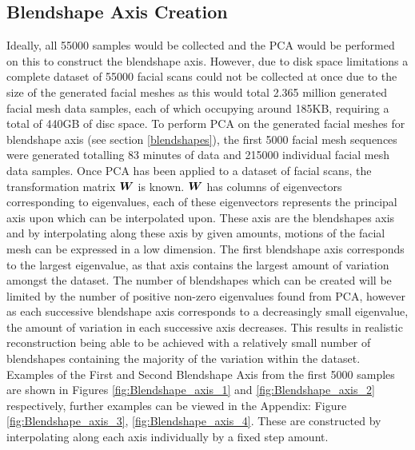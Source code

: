 \subsection{Blendshape Axis Creation}
Ideally, all 55000 samples would be collected and the PCA would be performed on this to construct the blendshape axis.
However, due to disk space limitations a complete dataset of 55000 facial scans could not be collected at once due to the size of the generated facial meshes as this would total 2.365 million generated facial mesh data samples, each of which occupying around 185KB, requiring a total of 440GB of disc space.
To perform PCA on the generated facial meshes for blendshape axis (see section \ref{blendshapes}), the first 5000 facial mesh sequences were generated totalling 83 minutes of data and 215000 individual facial mesh data samples. 
Once PCA has been applied to a dataset of facial scans, the transformation matrix ${\boldsymbol{{W}}}$ is known.
${\boldsymbol{{W}}}$ has columns of eigenvectors corresponding to eigenvalues, each of these eigenvectors represents the principal axis upon which can be interpolated upon.
These axis are the blendshapes axis and by interpolating along these axis by given amounts, motions of the facial mesh can be expressed in a low dimension.
The first blendshape axis corresponds to the largest eigenvalue, as that axis contains the largest amount of variation amongst the dataset.
The number of blendshapes which can be created will be limited by the number of positive non-zero eigenvalues found from PCA, however as each successive blendshape axis corresponds to a decreasingly small eigenvalue, the amount of variation in each successive axis decreases. 
This results in realistic reconstruction being able to be achieved with a relatively small number of blendshapes containing the majority of the variation within the dataset.
Examples of the First and Second Blendshape Axis from the first 5000 samples are shown in Figures \ref{fig:Blendshape_axis_1} and \ref{fig:Blendshape_axis_2} respectively, further examples can be viewed in the Appendix: Figure \ref{fig:Blendshape_axis_3}, \ref{fig:Blendshape_axis_4}.
These are constructed by interpolating along each axis individually by a fixed step amount.

